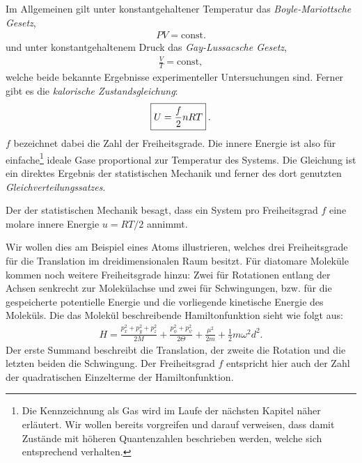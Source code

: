 Im Allgemeinen gilt unter konstantgehaltener Temperatur das \emph{Boyle-Mariottsche Gesetz},
\begin{align*}
    PV=\mathrm{const}. 
\end{align*}
und unter konstantgehaltenem Druck das \emph{Gay-Lussacsche Gesetz},
\begin{align*}
    \frac{V}{T}=\mathrm{const},
\end{align*}
welche beide bekannte Ergebnisse experimenteller Untersuchungen sind.
Ferner gibt es die \emph{kalorische Zustandsgleichung}:
\begin{align*}
    \boxed{U=\frac{f}{2}n RT}\:.
\end{align*}
$f$ bezeichnet dabei die Zahl der Freiheitsgrade. Die innere Energie ist also für einfache\footnote{Die Kennzeichnung als  Gas wird im Laufe der nächsten Kapitel näher erläutert. Wir wollen bereits vorgreifen und darauf verweisen, dass damit Zustände mit höheren Quantenzahlen beschrieben werden, welche sich entsprechend  verhalten.} ideale Gase proportional zur Temperatur des Systems.
Die Gleichung ist ein direktes Ergebnis der statistischen Mechanik und ferner des dort genutzten \emph{Gleichverteilungssatzes}.
\begin{formal}
    Der  der statistischen Mechanik besagt, dass ein System pro Freiheitsgrad $f$ eine molare innere Energie $u=RT/2$ annimmt.
\end{formal}
Wir wollen dies am Beispiel eines Atoms illustrieren, welches drei Freiheitsgrade für die Translation im dreidimensionalen Raum besitzt. Für diatomare Moleküle kommen noch weitere Freiheitsgrade hinzu: Zwei für Rotationen entlang der Achsen senkrecht zur Molekülachse und zwei für Schwingungen, bzw. für die gespeicherte potentielle Energie und die vorliegende kinetische Energie des Moleküls.
Die das Molekül beschreibende Hamiltonfunktion sieht wie folgt aus:
\begin{align*}
    H=\frac{p_x^2+p_y^2+p_z^2}{2M}+\frac{p_{\phi}^2+p_{\psi}^2}{2\Theta}+\frac{\mu^2}{2m}+\frac{1}{2}m\omega^2d^2.
\end{align*}
Der erste Summand beschreibt die Translation, der zweite die Rotation und die letzten beiden die Schwingung.
Der Freiheitsgrad $f$ entspricht hier auch der Zahl der quadratischen Einzelterme der Hamiltonfunktion.

